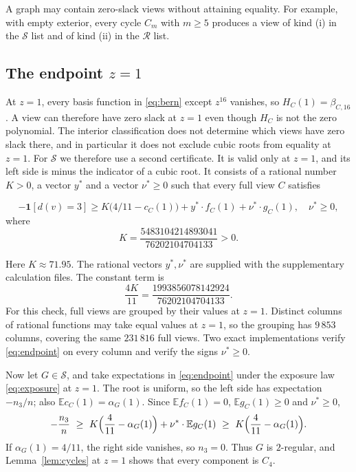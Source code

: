 \documentclass[11pt]{article}
\newcommand{\E}{\mathbb E}\newcommand{\Prob}{\mathbb P}
\newcommand{\ind}{\mathbf1}\newcommand{\F}{\mathcal F}\newcommand{\V}{\mathcal V}
\begin{document}
A graph may contain zero-slack views without attaining equality. For example, with empty exterior, every cycle $C_m$ with $m\ge5$ produces a view of kind (i) in the $\mathcal S$ list and of kind (ii) in the $\mathcal R$ list.

\subsection{The endpoint \texorpdfstring{$z=1$}{z=1}}
At $z=1$, every basis function in \eqref{eq:bern} except $z^{16}$ vanishes, so $H_C(1)=\beta_{C,16}$. A view can therefore have zero slack at $z=1$ even though $H_C$ is not the zero polynomial. The interior classification does not determine which views have zero slack there, and in particular it does not exclude cubic roots from equality at $z=1$. For $\mathcal S$ we therefore use a second certificate. It is valid only at $z=1$, and its left side is minus the indicator of a cubic root. It consists of a rational number $K>0$, a vector $y^{\ast}$ and a vector $\nu^{\ast}\ge0$ such that every full view $C$ satisfies
\begin{samepage}
\begin{equation}\label{eq:endpoint}
 -\ind[d(v)=3]\ge K\bigl(4/11-c_C(1)\bigr)
                 +y^{\ast}\cdot f_C(1)+\nu^{\ast}\cdot g_C(1),
 \quad \nu^{\ast}\ge0,
\end{equation}
where
\[
 K=\frac{5483104214893041}{76202104704133}>0.
\]
\end{samepage}
Here $K\approx71.95$. The rational vectors $y^{\ast},\nu^{\ast}$ are supplied with the supplementary calculation files. The constant term is
\[
 \frac{4K}{11}=\frac{1993856078142924}{76202104704133}.
\]
For this check, full views are grouped by their values at $z=1$. Distinct columns of rational functions may take equal values at $z=1$, so the grouping has $9\,853$ columns, covering the same $231\,816$ full views. Two exact implementations verify \eqref{eq:endpoint} on every column and verify the signs $\nu^{\ast}\ge0$.

Now let $G\in\mathcal S$, and take expectations in \eqref{eq:endpoint} under the exposure law \eqref{eq:exposure} at $z=1$. The root is uniform, so the left side has expectation $-n_3/n$; also $\E c_C(1)=\alpha_G(1)$. Since $\E f_C(1)=0$, $\E g_C(1)\ge0$ and $\nu^{\ast}\ge0$,
\[
 -\frac{n_3}n\ \ge\ K\Bigl(\frac4{11}-\alpha_G(1)\Bigr)+\nu^{\ast}\cdot\E g_C(1)
 \ \ge\ K\Bigl(\frac4{11}-\alpha_G(1)\Bigr).
\]
If $\alpha_G(1)=4/11$, the right side vanishes, so $n_3=0$. Thus $G$ is $2$-regular, and Lemma~\ref{lem:cycles} at $z=1$ shows that every component is $C_4$. 
\end{document}
